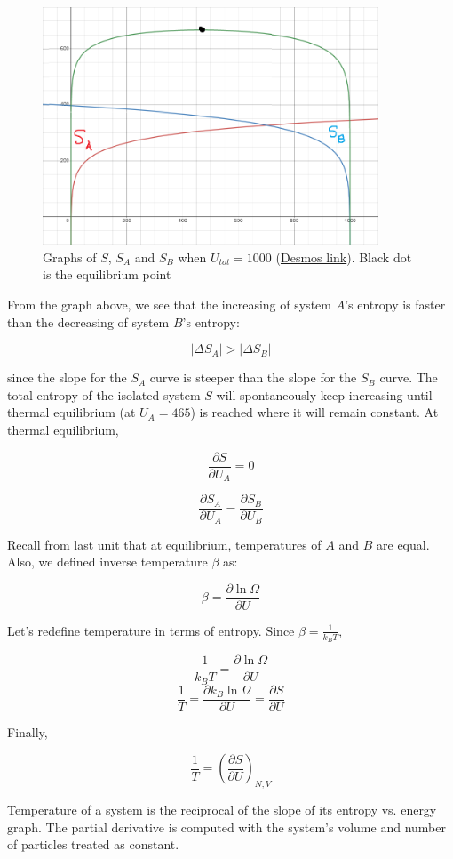 \documentclass[12pt, a4paper]{article}
\begin{document}
\begin{figure}[H]
\centering
\includegraphics[width=100mm]{33.png}
\caption{Graphs of $S$, $S_A$ and $S_B$ when $U_{tot}=1000$ (\href{https://www.desmos.com/calculator/px64pose4a}{Desmos link}). Black dot is the equilibrium point}
\end{figure}

From the graph above, we see that the increasing of system $A$'s entropy is faster than the decreasing of system $B$'s entropy:

\[|\Delta S_A|>|\Delta S_B|\]

since the slope for the $S_A$ curve is steeper than the slope for the $S_B$ curve. The total entropy of the isolated system $S$ will spontaneously keep increasing until thermal equilibrium (at $U_A=465$) is reached where it will remain constant. At thermal equilibrium,

\[\frac{\partial S}{\partial U_A}=0\]

\[\frac{\partial S_A}{\partial U_A}=\frac{\partial S_B}{\partial U_B}\]

Recall from last unit that at equilibrium, temperatures of $A$ and $B$ are equal. Also, we defined inverse temperature $\beta$ as:

\[\beta=\frac{\partial \ln\Omega}{\partial U}\]

Let's redefine temperature in terms of entropy. Since $\beta=\frac{1}{k_BT}$,

\[\frac{1}{k_BT}=\frac{\partial \ln\Omega}{\partial U}\]
\[\frac{1}{T}=\frac{\partial k_B\ln\Omega}{\partial U}=\frac{\partial S}{\partial U}\]

Finally,

\[\boxed{\frac{1}{T}=\left(\frac{\partial S}{\partial U}\right)_{N,V}}\]

Temperature of a system is the reciprocal of the slope of its entropy vs. energy graph. The partial derivative is computed with the system's volume and number of particles treated as constant. \\
\end{document}
